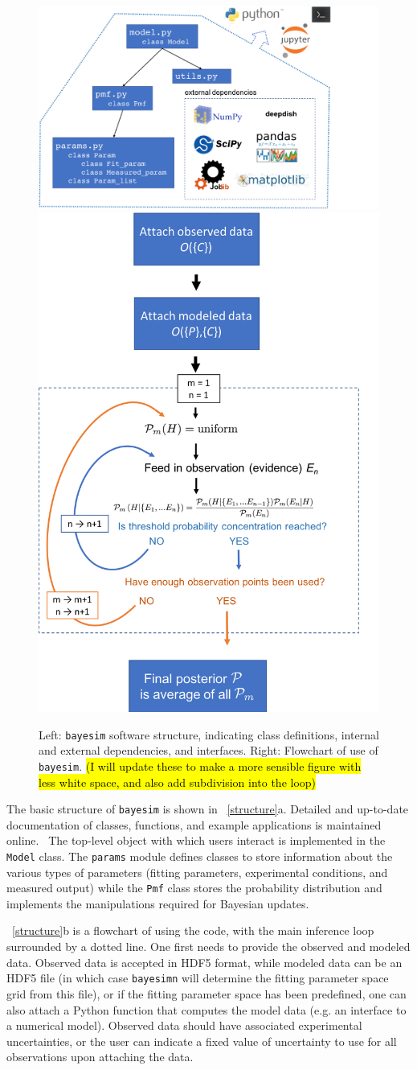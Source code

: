 \documentclass[aps,prl,amsmath,amssymb,superscriptaddress,notitlepage,groupedaddress]{revtex4-1}
\begin{document}
  \begin{figure}
    \includegraphics[width=0.55\columnwidth]{structure.png}
    \includegraphics[width=0.4\columnwidth]{flowchart.png}
    \caption{Left: \texttt{bayesim} software structure, indicating class definitions, internal and external dependencies, and interfaces. Right: Flowchart of use of \texttt{bayesim}. \hl{(I will update these to make a more sensible figure with less white space, and also add subdivision into the loop)}}
    \label{structure}
  \end{figure}

  The basic structure of \texttt{bayesim} is shown in ~\autoref{structure}a. Detailed and up-to-date documentation of classes, functions, and example applications is maintained online.~\cite{docs} The top-level object with which users interact is implemented in the \texttt{Model} class. The \texttt{params} module defines classes to store information about the various types of parameters (fitting parameters, experimental conditions, and measured output) while the \texttt{Pmf} class stores the probability distribution and implements the manipulations required for Bayesian updates.

  ~\autoref{structure}b is a flowchart of using the code, with the main inference loop surrounded by a dotted line. One first needs to provide the observed and modeled data. Observed data is accepted in HDF5 format, while modeled data can be an HDF5 file (in which case \texttt{bayesimn} will determine the fitting parameter space grid from this file), or if the fitting parameter space has been predefined, one can also attach a Python function that computes the model data (e.g. an interface to a numerical model). Observed data should have associated experimental uncertainties, or the user can indicate a fixed value of uncertainty to use for all observations upon attaching the data.
\end{document}
